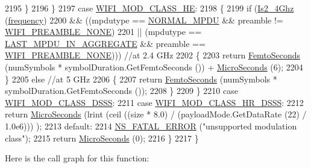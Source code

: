 \begin{DoxyCode}
2195           \}
2196       \}
2197     \textcolor{keywordflow}{case} \hyperlink{namespacens3_aa999e1221606a2b21b1eb33c2007c217abfa4f7272510045a9b43e8ac27ac13b0}{WIFI\_MOD\_CLASS\_HE}:
2198       \{
2199         \textcolor{keywordflow}{if} (\hyperlink{classns3_1_1WifiPhy_aaa5c580b1df6a1a17c45d4499cdde989}{Is2\_4Ghz} (\hyperlink{lte_2model_2fading-traces_2fading__trace__generator_8m_a09045328d6d7e16aa4013f526cc6993d}{frequency})
2200             && ((mpdutype == \hyperlink{namespacens3_ae617d41bbd0c07fa58ee2306f687b055a1fa7c2077d3b19b000b35004914f50eb}{NORMAL\_MPDU} && preamble != 
      \hyperlink{group__wifi_gga5e94a56cb338a14ffbbb19c6a41251eba97c5c71995de5f28931200e6d5a38a66}{WIFI\_PREAMBLE\_NONE})
2201                 || (mpdutype == \hyperlink{namespacens3_ae617d41bbd0c07fa58ee2306f687b055a00f5645550d1d4766ba10c4ac229b276}{LAST\_MPDU\_IN\_AGGREGATE} && preamble == 
      \hyperlink{group__wifi_gga5e94a56cb338a14ffbbb19c6a41251eba97c5c71995de5f28931200e6d5a38a66}{WIFI\_PREAMBLE\_NONE}))) \textcolor{comment}{//at 2.4 GHz}
2202           \{
2203             \textcolor{keywordflow}{return} \hyperlink{group__timecivil_ga7df0af9e3ea0a71baeba0fbde1c54943}{FemtoSeconds} (numSymbols * symbolDuration.GetFemtoSeconds ()) + 
      \hyperlink{group__timecivil_ga17465a639c8d1464e76538afdd78a9f0}{MicroSeconds} (6);
2204           \}
2205         \textcolor{keywordflow}{else} \textcolor{comment}{//at 5 GHz}
2206           \{
2207             \textcolor{keywordflow}{return} \hyperlink{group__timecivil_ga7df0af9e3ea0a71baeba0fbde1c54943}{FemtoSeconds} (numSymbols * symbolDuration.GetFemtoSeconds ());
2208           \}
2209       \}
2210     \textcolor{keywordflow}{case} \hyperlink{namespacens3_aa999e1221606a2b21b1eb33c2007c217aed8070e1ee089724d73fe63030cc112c}{WIFI\_MOD\_CLASS\_DSSS}:
2211     \textcolor{keywordflow}{case} \hyperlink{namespacens3_aa999e1221606a2b21b1eb33c2007c217a3c847bbae970f2de31e7b4eb7ff49840}{WIFI\_MOD\_CLASS\_HR\_DSSS}:
2212       \textcolor{keywordflow}{return} \hyperlink{group__timecivil_ga17465a639c8d1464e76538afdd78a9f0}{MicroSeconds} (lrint (ceil ((size * 8.0) / (payloadMode.GetDataRate (22) / 1.0e6)))
      );
2213     \textcolor{keywordflow}{default}:
2214       \hyperlink{group__fatal_ga5131d5e3f75d7d4cbfd706ac456fdc85}{NS\_FATAL\_ERROR} (\textcolor{stringliteral}{"unsupported modulation class"});
2215       \textcolor{keywordflow}{return} \hyperlink{group__timecivil_ga17465a639c8d1464e76538afdd78a9f0}{MicroSeconds} (0);
2216     \}
2217 \}
\end{DoxyCode}


Here is the call graph for this function\+:


